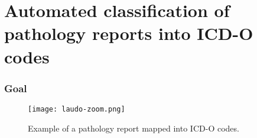 \section{Automated classification of pathology reports into ICD-O codes}


\begin{frame}
	\frametitle{Goal}
	\begin{figure}
		\centering
		\texttt{[image: laudo-zoom.png]}
		\caption{Example of a pathology report mapped into ICD-O codes.}
		\label{fig:laudo} 
	\end{figure}
\end{frame}
